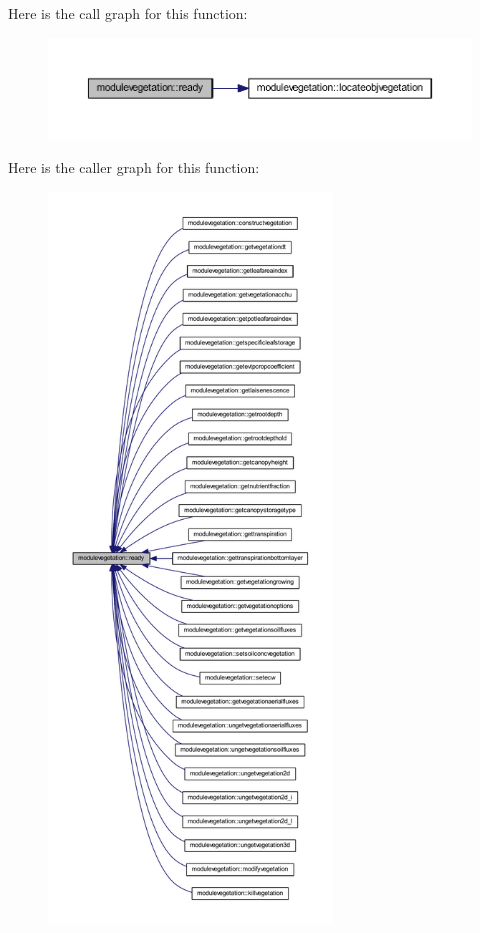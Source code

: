 Here is the call graph for this function\+:\nopagebreak
\begin{figure}[H]
\begin{center}
\leavevmode
\includegraphics[width=350pt]{namespacemodulevegetation_a7bff2743f33908bdf727831d101dc37a_cgraph}
\end{center}
\end{figure}
Here is the caller graph for this function\+:\nopagebreak
\begin{figure}[H]
\begin{center}
\leavevmode
\includegraphics[height=550pt]{namespacemodulevegetation_a7bff2743f33908bdf727831d101dc37a_icgraph}
\end{center}
\end{figure}
\mbox{\label{namespacemodulevegetation_a61c84b3c83334d731a2e537c7f0373fc}} 
